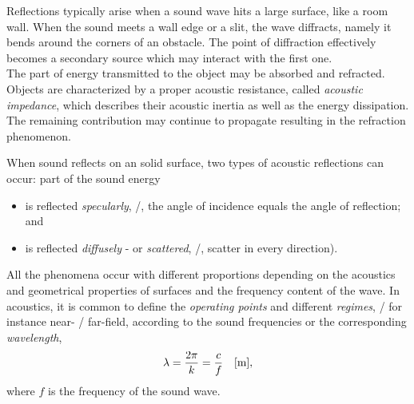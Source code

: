 Reflections typically arise when a sound wave hits a large surface, like a room wall.
When the sound meets a wall edge or a slit, the wave diffracts, namely it bends around the corners of an obstacle.
The point of diffraction effectively becomes a secondary source which may interact with the first one.
\\The part of energy transmitted to the object may be absorbed and refracted.
Objects are characterized by a proper acoustic resistance, called \textit{acoustic impedance}, which
describes their acoustic inertia as well as the energy dissipation.
The remaining contribution may continue to propagate resulting in the refraction phenomenon.

When sound reflects on an solid surface, two types of acoustic reflections can occur: part of the sound energy
\begin{itemize}
    \item is reflected \textit{specularly}, \ie/, the angle of incidence equals the angle of reflection; and
    \item is reflected \textit{diffusely} - or \textit{scattered}, \ie/, scatter in every direction).
\end{itemize}

All the phenomena occur with different proportions depending on the acoustics and geometrical properties of surfaces and the frequency content of the wave.
In acoustics, it is common to define the \textit{operating points} and different \textit{regimes}, \eg/ for instance near- \vs/ far-field,
according to the sound frequencies or the corresponding \textit{wavelength},
\begin{equation}
    \lambda = \frac{2 \pi}{k} = \frac{c}{f} \quad [\si{\metre}]
    ,
\end{equation}
where $f$ is the frequency of the sound wave.


